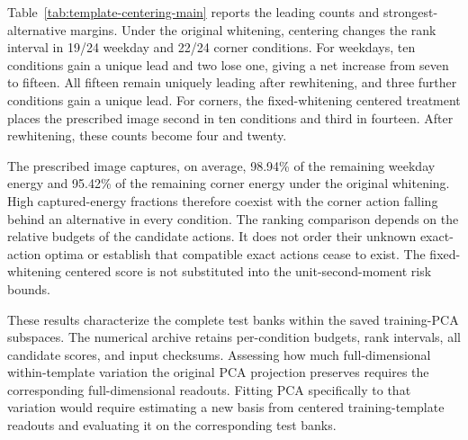 Table~\ref{tab:template-centering-main} reports the leading
counts and strongest-alternative margins.
Under the original whitening, centering changes the rank
interval in 19/24 weekday and 22/24 corner conditions.
For weekdays, ten conditions gain a unique lead and two lose
one, giving a net increase from seven to fifteen.
All fifteen remain uniquely leading after rewhitening,
and three further conditions gain a unique lead.
For corners, the fixed-whitening centered treatment places
the prescribed image second in ten conditions and third
in fourteen.
After rewhitening, these counts become four and twenty.

The prescribed image captures, on average, 98.94\% of the
remaining weekday energy and 95.42\% of the remaining corner
energy under the original whitening.
High captured-energy fractions therefore coexist with the
corner action falling behind an alternative in every condition.
The ranking comparison depends on the relative budgets of
the candidate actions. It does not order their unknown
exact-action optima or establish that compatible exact
actions cease to exist. The fixed-whitening centered score
is not substituted into the unit-second-moment risk bounds.

These results characterize the complete test banks within
the saved training-PCA subspaces.
The numerical archive retains per-condition budgets,
rank intervals, all candidate scores, and input checksums.
Assessing how much full-dimensional within-template variation
the original PCA projection preserves requires the corresponding
full-dimensional readouts.
Fitting PCA specifically to that variation would require
estimating a new basis from centered training-template
readouts and evaluating it on the corresponding test banks.

